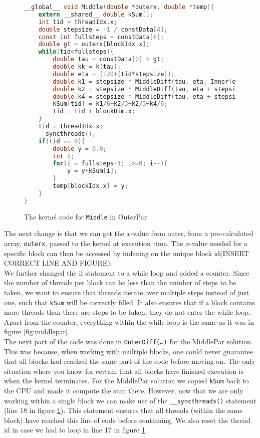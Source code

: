 \begin{figure}[ht]
\begin{lstlisting}[language=c]
__global__ void Middle(double *outerx, double *temp){
	extern __shared__ double kSum[];
	int tid = threadIdx.x;
	double stepsize = -1 / constData[4];
	const int fullsteps = constData[6];
	double gt = outerx[blockIdx.x];
	while(tid<fullsteps){
		double tau = constData[0] + gt;
		double kk = k(tau);
		double eta = (120+(tid*stepsize));
		double k1 = stepsize * MiddleDiff(tau, eta, Inner(eta, gt, kk).y);
		double k2 = stepsize * MiddleDiff(tau, eta + stepsize/2, Inner(eta + stepsize/2, gt, kk).y);		
		double k4 = stepsize * MiddleDiff(tau, eta + stepsize, Inner(eta + stepsize, gt, kk).y);
		kSum[tid] = k1/6+k2/3+k2/3+k4/6;
		tid = tid + blockDim.x;
	}
	tid = threadIdx.x;
	__syncthreads();
	if(tid == 0){
		double y = 0.0;
		int i;
		for(i = fullsteps-1; i>=0; i--){
			y = y+kSum[i];
		}
		temp[blockIdx.x] = y;
	}
}
\end{lstlisting}
\caption{The kernel code for \texttt{Middle} in OuterPar}
\label{fig:outerpar}
\end{figure}

The next change is that we can get the $x$-value from outer, from a pre-calculated array, \texttt{outerx}, passed to the kernel at execution time. The $x$-value needed for a specific block can then be accessed by indexing on the unique block id(INSERT CORRECT LINE AND FIGURE).\\

We further changed the if statement to a while loop and added a counter. Since the number of threads per block can be less than the number of steps to be taken, we want to ensure that threads iterate over multiple steps instead of just one, such that \texttt{kSum} will be correctly filled. It also ensures that if a block contains more threads than there are steps to be taken, they do not enter the while loop. Apart from the counter, everything within the while loop is the same as it was in figure \ref{fig:middlepar}.\\

The next part of the code was done in \texttt{OuterDiff(…)} for the MiddlePar solution. This was because, when working with multiple blocks, one could never guarantee that all blocks had reached the same part of the code before moving on. The only situation where you know for certain that all blocks have finished execution is when the kernel terminates. For the MiddlePar solution we copied \texttt{kSum} back to the CPU and made it compute the sum there. However, now that we are only working within a single block we can make use of the \texttt{\_\_syncthreads()} statement (line 18 in figure \ref{fig:outerpar}). This statement ensures that all threads (within the same block) have reached this line of code before continuing. We also reset the thread id in case we had to loop in line 17 in figure \ref{fig:outerpar}. \\

